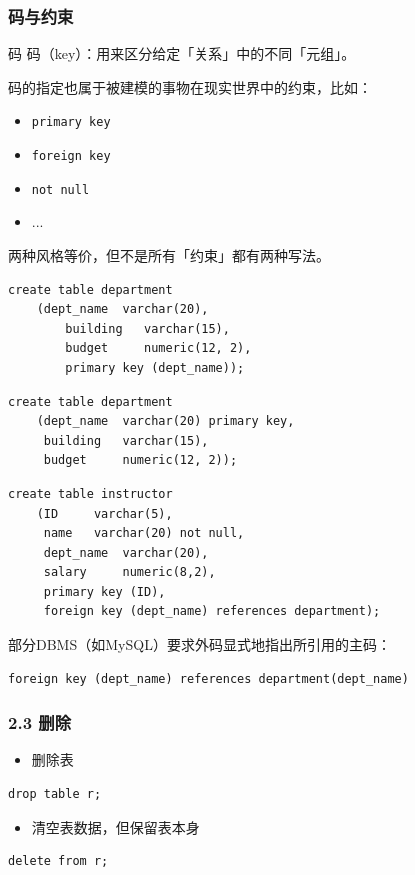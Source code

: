 \documentclass[aspectratio=169, 14pt]{beamer}
\begin{document}
\begin{frame}
    \frametitle{码与约束}
\begin{block}{码}
    码（key）：用来区分给定「关系」中的不同「元组」。
\end{block}
码的指定也属于被建模的事物在现实世界中的\alert{约束}，比如：

\begin{itemize}
    \item \texttt{primary key}
    \item \texttt{foreign key}
    \item \texttt{not null}
    \item ...
\end{itemize}

\end{frame}

\begin{frame}[fragile]
    两种风格等价，但不是所有「约束」都有两种写法。

    \begin{verbatim}
create table department
    (dept_name  varchar(20),
        building   varchar(15),
        budget     numeric(12, 2),
        primary key (dept_name)); 
    \end{verbatim}

        \begin{verbatim}
create table department
    (dept_name  varchar(20) primary key,
     building   varchar(15),
     budget     numeric(12, 2)); 
        \end{verbatim} 

\end{frame}

\begin{frame}[fragile]
    \begin{verbatim}
create table instructor
    (ID     varchar(5), 
     name   varchar(20) not null, 
     dept_name  varchar(20),
     salary     numeric(8,2),
     primary key (ID),
     foreign key (dept_name) references department);
    \end{verbatim} 
\pause
部分DBMS（如MySQL）要求外码显式地指出所引用的主码：
\begin{verbatim}
foreign key (dept_name) references department(dept_name)
\end{verbatim}
\end{frame}

\begin{frame}[fragile]
    \frametitle{2.3 删除}
\begin{itemize}
    \item 删除表
\end{itemize}    
\begin{verbatim}
drop table r;
\end{verbatim}

\begin{itemize}
    \item 清空表数据，但保留表本身
\end{itemize}  
\begin{verbatim}
delete from r;
\end{verbatim}
\end{frame}
\end{document}

